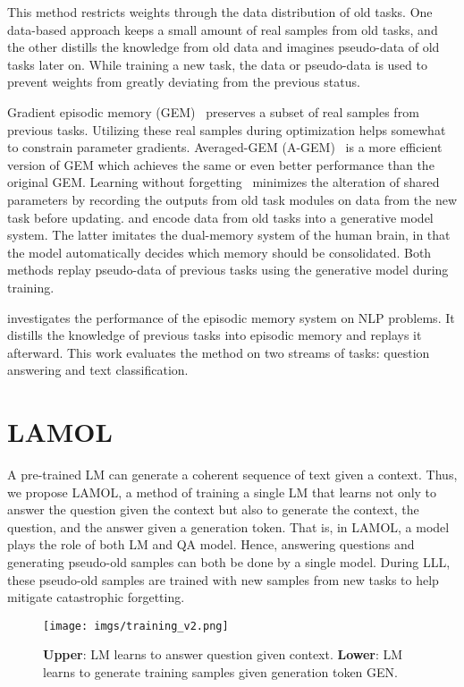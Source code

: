 \documentclass{article} \usepackage{iclr2020_conference,times}
\begin{document}
This method restricts weights through the data distribution of old tasks. One data-based approach keeps a small amount of real samples from old tasks, and the other distills the knowledge from old data and imagines pseudo-data of old tasks later on. While training a new task, the data or pseudo-data is used to prevent weights from greatly deviating from the previous status.

Gradient episodic memory (GEM)~\citep{lopez2017gradient} preserves a subset of real samples from previous tasks.
Utilizing these real samples during optimization helps somewhat to constrain parameter gradients.
Averaged-GEM (A-GEM)~\citep{chaudhry2018efficient} is a more efficient version of GEM which achieves the same or even better performance than the original GEM. Learning without forgetting~\citep{li2017learning} minimizes the alteration of shared parameters by recording the outputs from old task modules on data from the new task before updating. \citet{shin2017continual} and \citet{kemker2017fearnet} encode data from old tasks into a generative model system. The latter imitates the dual-memory system of the human brain, in that the model automatically decides which memory should be consolidated. 
Both methods replay pseudo-data of previous tasks using the generative model during training. 

\citet{d2019episodic} investigates the performance of the episodic memory system on NLP problems. 
It distills the knowledge of previous tasks into episodic memory and replays it afterward.
This work evaluates the method on two streams of tasks: question answering and text classification.\\





\section{LAMOL}\label{sec:our}
A pre-trained LM can generate a coherent sequence of text given a context.  Thus, we propose LAMOL, a method of training a single LM that learns not only to answer the question given the context but also to generate the context, the question, and the answer given a generation token.
That is, in LAMOL, a model plays the role of both LM and QA model.
Hence, answering questions and generating pseudo-old samples can both be done by a single model.
During LLL, these pseudo-old samples are trained with new samples from new tasks to help mitigate catastrophic forgetting.
\begin{figure}[!tp]
    \centering
    \texttt{[image: imgs/training\_v2.png]}
    \caption{\textbf{Upper}: LM learns to answer question given context.
    \textbf{Lower}: LM learns to generate training samples given generation token GEN.}
  \label{fig:training}
\end{figure}
%
 
\end{document}
